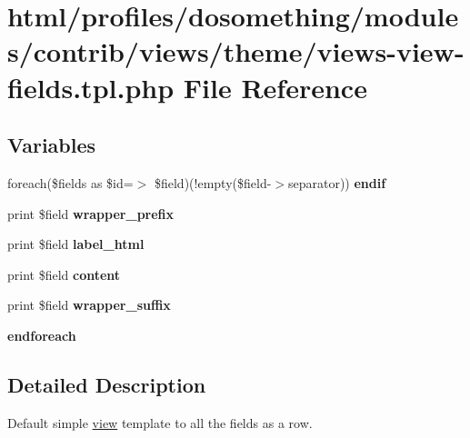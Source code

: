 \hypertarget{views-view-fields_8tpl_8php}{
\section{html/profiles/dosomething/modules/contrib/views/theme/views-\/view-\/fields.tpl.php File Reference}
\label{views-view-fields_8tpl_8php}
}
\subsection*{Variables}
\begin{DoxyCompactItemize}
\item 
\hypertarget{views-view-fields_8tpl_8php_aff624acfa2aa6fc2bcd1cd98129430e1}{
foreach(\$fields as \$id=$>$ \$field)(!empty(\$field-\/$>$separator)) {\bfseries endif}}
\label{views-view-fields_8tpl_8php_aff624acfa2aa6fc2bcd1cd98129430e1}

\item 
\hypertarget{views-view-fields_8tpl_8php_ab053784234d2433996c088a18f633b0e}{
print \$field {\bfseries wrapper\_\-prefix}}
\label{views-view-fields_8tpl_8php_ab053784234d2433996c088a18f633b0e}

\item 
\hypertarget{views-view-fields_8tpl_8php_ac940b7c2582787350f086a83d4505f8b}{
print \$field {\bfseries label\_\-html}}
\label{views-view-fields_8tpl_8php_ac940b7c2582787350f086a83d4505f8b}

\item 
\hypertarget{views-view-fields_8tpl_8php_ab9c021825db1d9cdc4bf17f40b3bd76c}{
print \$field {\bfseries content}}
\label{views-view-fields_8tpl_8php_ab9c021825db1d9cdc4bf17f40b3bd76c}

\item 
\hypertarget{views-view-fields_8tpl_8php_a32a5a8f2434deffa8bdadaf86e1f8548}{
print \$field {\bfseries wrapper\_\-suffix}}
\label{views-view-fields_8tpl_8php_a32a5a8f2434deffa8bdadaf86e1f8548}

\item 
\hypertarget{views-view-fields_8tpl_8php_a672d9707ef91db026c210f98cc601123}{
{\bfseries endforeach}}
\label{views-view-fields_8tpl_8php_a672d9707ef91db026c210f98cc601123}

\end{DoxyCompactItemize}


\subsection{Detailed Description}
Default simple \hyperlink{classview}{view} template to all the fields as a row.


